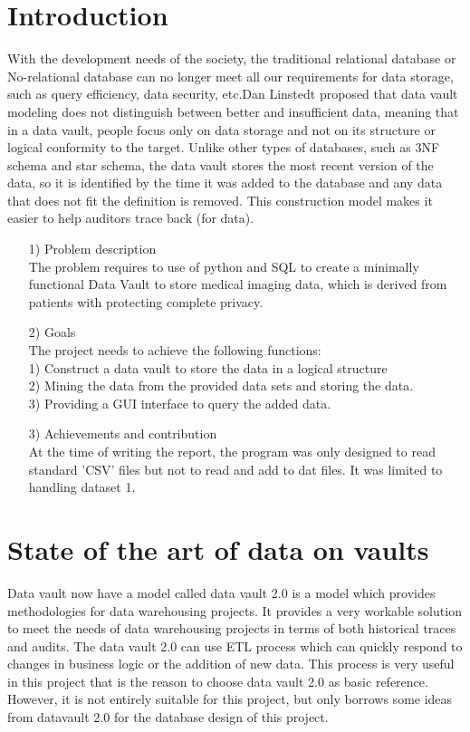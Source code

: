 \documentclass[conference]{IEEEtran}
\begin{document}
\section{Introduction}\label{sec:Intro}
With the development needs of the society, the traditional relational database or No-relational database can no longer meet all our requirements for data storage, such as query efficiency, data security, etc.Dan Linstedt proposed that data vault modeling does not distinguish between better and insufficient data\cite{b2}, meaning that in a data vault, people focus only on data storage and not on its structure or logical conformity to the target. Unlike other types of databases, such as 3NF schema and star schema, the data vault stores the most recent version of the data, so it is identified by the time it was added to the database and any data that does not fit the definition is removed. This construction model makes it easier to help auditors trace back (for data).%

\begin{itemize}
	\item [1) ] 
	Problem description\\
	The problem requires to use of python and SQL to create a minimally functional Data Vault to store medical imaging data, which is derived from patients with protecting complete privacy.     
	\item [2)]
	Goals\\
    The project needs to achieve the following functions:\\ 1) Construct a data vault to store the data in a logical structure\\ 2) Mining the data from the provided data sets and storing the data.\\ 3) Providing a GUI interface to query the added data. 
	\item [3)]
	Achievements and contribution\\
	At the time of writing the report, the program was only designed to read standard 'CSV' files but not to read and add to dat files. It was limited to handling dataset 1. 
\end{itemize}

\section{State of the art of data on vaults}
Data vault now have a model called data vault 2.0 is a model which provides methodologies for data warehousing projects. It provides a very workable solution to meet the needs of data warehousing projects in terms of both historical traces and audits. The data vault 2.0 can use ETL \cite{b3} process which can quickly respond to changes in business logic or the addition of new data. This process is very useful in this project that is the reason to choose data vault 2.0 as basic reference. However, it is not entirely suitable for this project, but only borrows some ideas from datavault 2.0 for the database design of this project.
\end{document}
